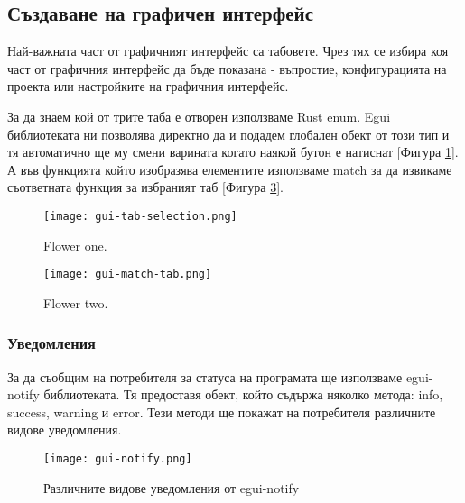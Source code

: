 \subsection{Създаване на графичен интерфейс}
Най-важната част от графичният интерфейс са табовете. Чрез тях се избира коя
част от графичния интерфейс да бъде показана - въпростие, конфигурацията на
проекта или настройките на графичния интерфейс.

За да знаем кой от трите таба е отворен използваме Rust enum. Egui библиотеката
ни позволява директно да и подадем глобален обект от този тип и тя автоматично
ще му смени варината когато наякой бутон е натиснат [Фигура
\ref{fig:gui-tab-selection}]. А във функцията който изобразява елементите
използваме match за да извикаме съответната функция за избраният таб [Фигура
\ref{fig:gui-match-tab}].

\begin{figure}[!htb]
    \centering
    \texttt{[image: gui-tab-selection.png]}
    \caption{Flower one.}
    \label{fig:gui-tab-selection}
\end{figure}
\begin{figure}[!htb]
    \centering
    \texttt{[image: gui-match-tab.png]}
    \caption{Flower two.}
    \label{fig:gui-match-tab}
\end{figure}

\newpage

\subsubsection{Уведомления}
За да съобщим на потребителя за статуса на програмата ще използваме egui-notify
библиотеката. Тя предоставя обект, който съдържа няколко метода: info, success, warning и error.
Тези методи ще покажат на потребителя различните видове уведомления.
\begin{figure}[!htb]
    \centering
    \texttt{[image: gui-notify.png]}
    \caption{Различните видове уведомления от egui-notify}
    \label{fig:gui-match-tab}
\end{figure}




